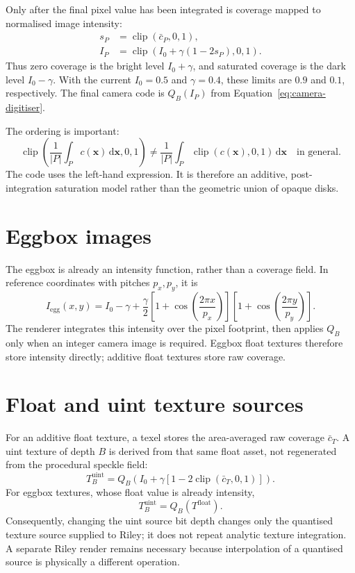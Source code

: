 \documentclass[11pt,a4paper]{article}
\newcommand{\clip}{\operatorname{clip}}
\begin{document}
Only after the final pixel value has been integrated is coverage mapped to
normalised image intensity:
\begin{align}
  s_P &= \clip(\bar c_P,0,1),\\
  I_P &= \clip\!\left(I_0+\gamma(1-2s_P),0,1\right).
  \label{eq:coverage-intensity}
\end{align}
Thus zero coverage is the bright level $I_0+\gamma$, and saturated coverage is
the dark level $I_0-\gamma$.  With the current $I_0=0.5$ and $\gamma=0.4$,
these limits are $0.9$ and $0.1$, respectively.  The final camera code is
$Q_B(I_P)$ from Equation~\eqref{eq:camera-digitiser}.

The ordering is important:
\begin{equation}
 \clip\!\left(\frac{1}{|P|}\int_P c(\bm{x})\,\mathrm{d}\bm{x},0,1\right)
 \neq
 \frac{1}{|P|}\int_P\clip(c(\bm{x}),0,1)\,\mathrm{d}\bm{x}
 \quad\text{in general}.
\end{equation}
The code uses the left-hand expression.  It is therefore an additive,
post-integration saturation model rather than the geometric union of opaque
disks.

\section{Eggbox images}

The eggbox is already an intensity function, rather than a coverage field.  In
reference coordinates with pitches $p_x,p_y$, it is
\begin{equation}
 I_{\mathrm{egg}}(x,y)=I_0-\gamma+
 \frac{\gamma}{2}
 \left[1+\cos\!\left(\frac{2\pi x}{p_x}\right)\right]
 \left[1+\cos\!\left(\frac{2\pi y}{p_y}\right)\right].
\end{equation}
The renderer integrates this intensity over the pixel footprint, then applies
$Q_B$ only when an integer camera image is required.  Eggbox float textures
therefore store intensity directly; additive float textures store raw coverage.

\section{Float and uint texture sources}

For an additive float texture, a texel stores the area-averaged raw coverage
$\bar c_T$.  A uint texture of depth $B$ is derived from that same float asset,
not regenerated from the procedural speckle field:
\begin{equation}
 T^{\mathrm{uint}}_B = Q_B\!\left(
 I_0+\gamma\left[1-2\clip(\bar c_T,0,1)\right]\right).
 \label{eq:uint-texture}
\end{equation}
For eggbox textures, whose float value is already intensity,
\begin{equation}
 T^{\mathrm{uint}}_B = Q_B(T^{\mathrm{float}}).
\end{equation}
Consequently, changing the uint source bit depth changes only the quantised
texture source supplied to Riley; it does not repeat analytic texture
integration.  A separate Riley render remains necessary because interpolation
of a quantised source is physically a different operation.
\end{document}

